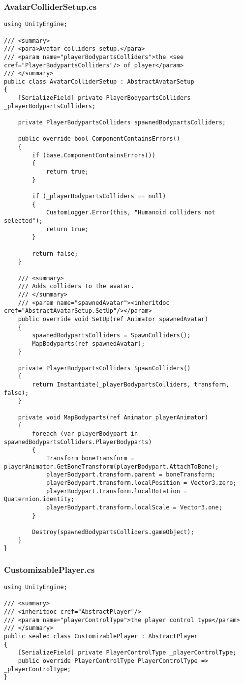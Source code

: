 \subsubsection*{AvatarColliderSetup.cs}
\begin{verbatim}
using UnityEngine;

/// <summary>
/// <para>Avatar colliders setup.</para>
/// <param name="playerBodypartsColliders">the <see cref="PlayerBodypartsColliders"/> of player</param>
/// </summary>
public class AvatarColliderSetup : AbstractAvatarSetup
{
    [SerializeField] private PlayerBodypartsColliders _playerBodypartsColliders;
    
    private PlayerBodypartsColliders spawnedBodypartsColliders;

    public override bool ComponentContainsErrors()
    {
        if (base.ComponentContainsErrors())
        {
            return true;
        }

        if (_playerBodypartsColliders == null)
        {
            CustomLogger.Error(this, "Humanoid colliders not selected");
            return true;
        }

        return false;
    }

    /// <summary>
    /// Adds colliders to the avatar.
    /// </summary>
    /// <param name="spawnedAvatar"><inheritdoc cref="AbstractAvatarSetup.SetUp"/></param>
    public override void SetUp(ref Animator spawnedAvatar)
    {
        spawnedBodypartsColliders = SpawnColliders();
        MapBodyparts(ref spawnedAvatar);
    }

    private PlayerBodypartsColliders SpawnColliders()
    {
        return Instantiate(_playerBodypartsColliders, transform, false);
    }

    private void MapBodyparts(ref Animator playerAnimator)
    {
        foreach (var playerBodypart in spawnedBodypartsColliders.PlayerBodyparts)
        {
            Transform boneTransform = playerAnimator.GetBoneTransform(playerBodypart.AttachToBone);
            playerBodypart.transform.parent = boneTransform;
            playerBodypart.transform.localPosition = Vector3.zero;
            playerBodypart.transform.localRotation = Quaternion.identity;
            playerBodypart.transform.localScale = Vector3.one;
        }

        Destroy(spawnedBodypartsColliders.gameObject);
    }
}
\end{verbatim}
\subsubsection*{CustomizablePlayer.cs}
\begin{verbatim}
using UnityEngine;

/// <summary>
/// <inheritdoc cref="AbstractPlayer"/>
/// <param name="playerControlType">the player control type</param>
/// </summary>
public sealed class CustomizablePlayer : AbstractPlayer
{
    [SerializeField] private PlayerControlType _playerControlType;
    public override PlayerControlType PlayerControlType => _playerControlType;
}
\end{verbatim}
